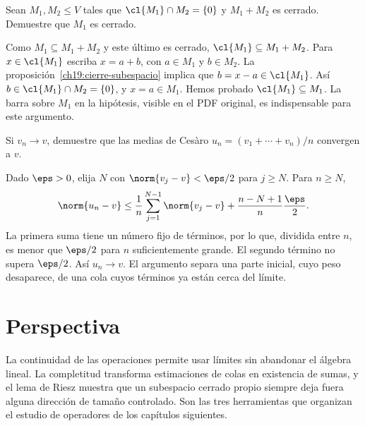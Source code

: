 \begin{ejercicio}
Sean $M_1,M_2\leq V$ tales que $\cl{M_1}\cap M_2=\{0\}$ y $M_1+M_2$ es cerrado. Demuestre que $M_1$ es cerrado.
\end{ejercicio}
\begin{solucion}
Como $M_1\subseteq M_1+M_2$ y este último es cerrado, $\cl{M_1}\subseteq M_1+M_2$. Para $x\in\cl{M_1}$ escriba $x=a+b$, con $a\in M_1$ y $b\in M_2$. La proposición~\ref{ch19:cierre-subespacio} implica que $b=x-a\in\cl{M_1}$. Así $b\in\cl{M_1}\cap M_2=\{0\}$, y $x=a\in M_1$. Hemos probado $\cl{M_1}\subseteq M_1$. La barra sobre $M_1$ en la hipótesis, visible en el PDF original, es indispensable para este argumento.
\end{solucion}

\begin{ejercicio}
Si $v_n\to v$, demuestre que las medias de Cesàro $u_n=(v_1+\cdots+v_n)/n$ convergen a $v$.
\end{ejercicio}
\begin{solucion}
Dado $\eps>0$, elija $N$ con $\norm{v_j-v}<\eps/2$ para $j\geq N$. Para $n\geq N$,
\[
 \norm{u_n-v}\leq
 \frac1n\sum_{j=1}^{N-1}\norm{v_j-v}
 +\frac{n-N+1}{n}\frac\eps2.
\]
La primera suma tiene un número fijo de términos, por lo que, dividida entre $n$, es menor que $\eps/2$ para $n$ suficientemente grande. El segundo término no supera $\eps/2$. Así $u_n\to v$. El argumento separa una parte inicial, cuyo peso desaparece, de una cola cuyos términos ya están cerca del límite.
\end{solucion}

\section{Perspectiva}
La continuidad de las operaciones permite usar límites sin abandonar el álgebra lineal. La completitud transforma estimaciones de colas en existencia de sumas, y el lema de Riesz muestra que un subespacio cerrado propio siempre deja fuera alguna dirección de tamaño controlado. Son las tres herramientas que organizan el estudio de operadores de los capítulos siguientes.
